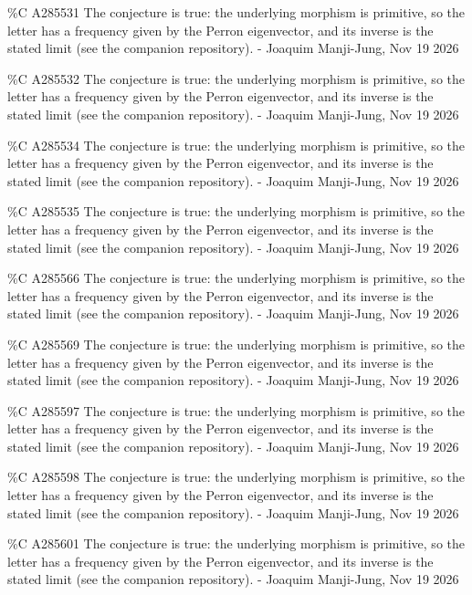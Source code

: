 {\%C A285531 The conjecture is true: the underlying morphism is primitive, so the letter has a frequency given by the Perron eigenvector, and its inverse is the stated limit (see the companion repository). - Joaquim Manji-Jung, Nov 19 2026\par
\%C A285532 The conjecture is true: the underlying morphism is primitive, so the letter has a frequency given by the Perron eigenvector, and its inverse is the stated limit (see the companion repository). - Joaquim Manji-Jung, Nov 19 2026\par
\%C A285534 The conjecture is true: the underlying morphism is primitive, so the letter has a frequency given by the Perron eigenvector, and its inverse is the stated limit (see the companion repository). - Joaquim Manji-Jung, Nov 19 2026\par
\%C A285535 The conjecture is true: the underlying morphism is primitive, so the letter has a frequency given by the Perron eigenvector, and its inverse is the stated limit (see the companion repository). - Joaquim Manji-Jung, Nov 19 2026\par
\%C A285566 The conjecture is true: the underlying morphism is primitive, so the letter has a frequency given by the Perron eigenvector, and its inverse is the stated limit (see the companion repository). - Joaquim Manji-Jung, Nov 19 2026\par
\%C A285569 The conjecture is true: the underlying morphism is primitive, so the letter has a frequency given by the Perron eigenvector, and its inverse is the stated limit (see the companion repository). - Joaquim Manji-Jung, Nov 19 2026\par
\%C A285597 The conjecture is true: the underlying morphism is primitive, so the letter has a frequency given by the Perron eigenvector, and its inverse is the stated limit (see the companion repository). - Joaquim Manji-Jung, Nov 19 2026\par
\%C A285598 The conjecture is true: the underlying morphism is primitive, so the letter has a frequency given by the Perron eigenvector, and its inverse is the stated limit (see the companion repository). - Joaquim Manji-Jung, Nov 19 2026\par
\%C A285601 The conjecture is true: the underlying morphism is primitive, so the letter has a frequency given by the Perron eigenvector, and its inverse is the stated limit (see the companion repository). - Joaquim Manji-Jung, Nov 19 2026\par
}
